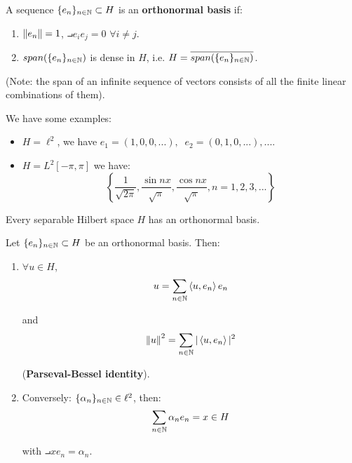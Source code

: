 \begin{fdefinition}
    A sequence $\{e_n\}_{n \in \mathbb{N}} \subset H$ is an \textbf{orthonormal basis} if:
    \vspace{1em}
    \begin{enumerate}[label=(\roman*)]
        \item $\left\|e_n\right\| = 1$, $\intprod{e_i}{e_j} = 0$ $\forall i \neq j$.
        \vspace{1em}
        \item $span (\{e_n\}_{n \in \mathbb{N}})$ is dense in $H$, i.e. $H = \overline{span (\{e_n\}_{n \in \mathbb{N}})}$.
    \end{enumerate}
    \vspace{1em}
    (Note: the span of an infinite sequence of vectors consists of all the finite linear combinations of them).
\end{fdefinition}

\begin{example}
    We have some examples:
    \begin{itemize}
        \item $H = \ell^2$, we have $e_1 = (1, 0, 0, ...), \; \; e_2 = (0, 1, 0, ...), ...$.
        \item $H = L^2[-\pi, \pi]$ we have:
        $$\left\{ \frac{1}{\sqrt{2\pi}}, \frac{\sin nx}{\sqrt{\pi}},\frac{\cos nx}{\sqrt{\pi}}, n = 1, 2, 3, ... \right\}$$ 
    \end{itemize}
\end{example}

\begin{ftheorem}
    Every separable Hilbert space $H$ has an orthonormal basis.
\end{ftheorem}

\begin{ftheorem}
    Let $\{e_n\}_{n \in \mathbb{N}} \subset H$ be an orthonormal basis. Then:
    \vspace{1em}
    \begin{enumerate}[label=(\roman*)]
        \item $\forall u \in H$, 
        $$u = \sum_{n \in \mathbb{N}} \left\langle u, e_n \right\rangle e_n$$

        and
        $$\left\|u\right\|^2 = \sum_{n \in \mathbb{N}} |\left\langle u, e_n \right\rangle|^2$$

        (\textbf{Parseval-Bessel identity}).

        \vspace{1em}

        \item Conversely: $\{\alpha_n\}_{n \in \mathbb{N}} \in \ell^2$, then:
        $$\sum_{n \in \mathbb{N}} \alpha_n e_n = x \in H$$

        with $\intprod{x}{e_n} = \alpha_n$.
    \end{enumerate}
\end{ftheorem}

